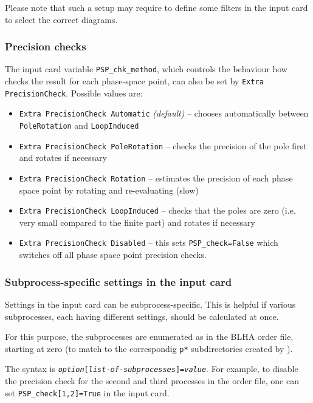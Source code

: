 Please note that such a setup may require
to define some filters in the input card to select the correct diagrams.

\subsubsection{Precision checks}

The \gosam{} input card variable \texttt{PSP\_chk\_method}, which
controls the behaviour how \gosam{} checks the result for each phase-space point,
can also be set by \texttt{Extra PrecisionCheck}.
Possible values are:

\begin{itemize}
	\item \texttt{Extra PrecisionCheck Automatic} \textit{(default)} -- chooses automatically between \texttt{PoleRotation} and \texttt{LoopInduced}
	\item \texttt{Extra PrecisionCheck PoleRotation} -- checks the precision of the pole first and rotates if necessary
	\item \texttt{Extra PrecisionCheck Rotation} -- estimates the precision of each phase space point by rotating and re-evaluating (slow)
	\item \texttt{Extra PrecisionCheck LoopInduced} -- checks that the poles are zero (i.e. very small compared to the finite part) and rotates if necessary
	\item \texttt{Extra PrecisionCheck Disabled}  -- this sets \texttt{PSP\_check=False} which switches off all phase space point precision checks.
\end{itemize}


\subsubsection{Subprocess-specific settings in the \gosam{} input card}
Settings in the \gosam{} input card can be subprocess-specific.
This is helpful if various subprocesses, each having different settings, should be calculated at once.

For this purpose, the subprocesses are enumerated as in the BLHA order file, starting at zero (to match to the
correspondig \texttt{p*} subdirectories created by \gosam{}).\\

The syntax is \texttt{\textit{option}[\textit{list-of-subprocesses}]=\textit{value}}.
For example, to disable the precision check 
for the second and third processes in the order file,
one can set \texttt{PSP\_check[1,2]=True} in the input card.

